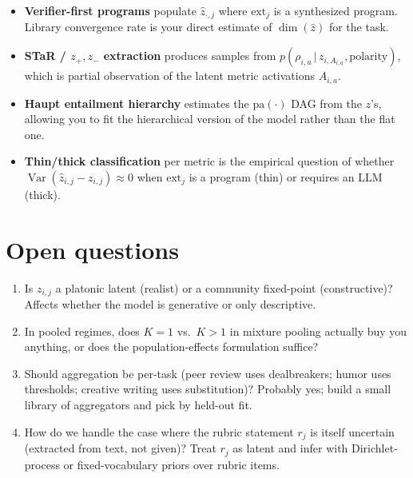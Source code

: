 \documentclass[11pt]{article}
\newcommand{\given}{\,|\,}
\newcommand{\Var}{\operatorname{Var}}
\begin{document}
\begin{itemize}[topsep=2pt,itemsep=2pt]
\item \textbf{Verifier-first programs} populate $\hat z_{\cdot,j}$ where $\text{ext}_j$ is
      a synthesized program. Library convergence rate is your direct estimate of
      $\dim(\hat z)$ for the task.
\item \textbf{STaR / $z_+, z_-$ extraction} produces samples from
      $p(\rho_{i,a} \given z_{i,A_{i,a}}, \text{polarity})$, which is partial observation
      of the latent metric activations $A_{i,a}$.
\item \textbf{Haupt entailment hierarchy} estimates the $\mathrm{pa}(\cdot)$ DAG from the
      $z$'s, allowing you to fit the hierarchical version of the model rather than the
      flat one.
\item \textbf{Thin/thick classification} per metric is the empirical question of whether
      $\Var(\hat z_{i,j} - z_{i,j}) \approx 0$ when $\text{ext}_j$ is a program (thin) or
      requires an LLM (thick).
\end{itemize}

\section{Open questions}

\begin{enumerate}[topsep=2pt,itemsep=2pt]
\item Is $z_{i,j}$ a platonic latent (realist) or a community fixed-point (constructive)?
      Affects whether the model is generative or only descriptive.
\item In pooled regimes, does $K{=}1$ vs.\ $K{>}1$ in mixture pooling actually buy you
      anything, or does the population-effects formulation suffice?
\item Should aggregation be per-task (peer review uses dealbreakers; humor uses
      thresholds; creative writing uses substitution)? Probably yes; build a small library
      of aggregators and pick by held-out fit.
\item How do we handle the case where the rubric statement $r_j$ is itself uncertain
      (extracted from text, not given)? Treat $r_j$ as latent and infer with
      Dirichlet-process or fixed-vocabulary priors over rubric items.
\end{enumerate}
\end{document}
